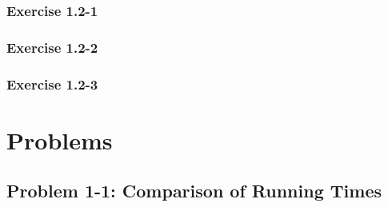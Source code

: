 \documentclass{article}
\begin{document}
\subsubsection*{Exercise 1.2-1}


\subsubsection*{Exercise 1.2-2}


\subsubsection*{Exercise 1.2-3}


\section*{Problems}
\subsection*{Problem 1-1: Comparison of Running Times}
\end{document}
